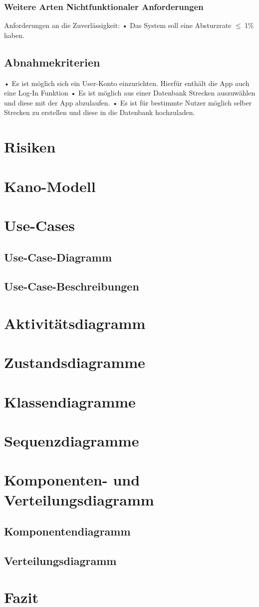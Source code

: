 \documentclass[a4paper, 12pp]{article}
\begin{document}
\subsubsection{Weitere Arten Nichtfunktionaler Anforderungen}
Anforderungen an die Zuverlässigkeit:\newline
• Das System soll eine Absturzrate  $\leq \ $1\% haben.
\subsection{Abnahmekriterien}
• Es ist möglich sich ein User-Konto einzurichten. Hierfür enthält die App auch eine Log-In Funktion\newline
• Es ist möglich aus einer Datenbank Strecken auszuwählen und diese mit der App abzulaufen.\newline
• Es ist für bestimmte Nutzer möglich selber Strecken zu erstellen und diese in die Datenbank hochzuladen.
\section{Risiken}
\section{Kano-Modell}
\section{Use-Cases}
\subsection{Use-Case-Diagramm}
\subsection{Use-Case-Beschreibungen}
\section{Aktivitätsdiagramm}
\section{Zustandsdiagramme}
\section{Klassendiagramme}
\section{Sequenzdiagramme}
\section{Komponenten- und Verteilungsdiagramm}
\subsection{Komponentendiagramm}
\subsection{Verteilungsdiagramm}
\section{Fazit}
\end{document}
